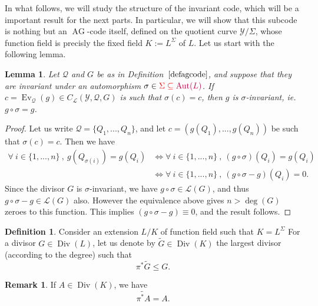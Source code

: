 \documentclass[10pt]{article}
\newtheorem{lem1}[thm]{Lemma}
\theoremstyle{definition}
\newtheorem{rq1}[thm]{Remark}
\theoremstyle{definition}
\theoremstyle{definition}
\newtheorem{def1}[thm]{Definition}
\newcommand{\s}{\vspace{0.3cm}}
\newcommand{\su}{\subseteq}
\newcommand{\Y}{\mathcal{Y}}
\newcommand{\QR}{\mathcal{Q}}
\newcommand{\Div}{\operatorname{Div}}
\newcommand{\Aut}{\operatorname{Aut}}
\newcommand{\ag}{\operatorname{AG}}
\newcommand{\calL}{\mathcal{L}}
\begin{document}
In what follows, we will study the structure of the invariant code, which will be a important result for the next parts. In particular, we will show that this subcode is nothing but an $\ag$-code itself, defined on the quotient curve $\Y/\Sigma$, whose function field is precisly the fixed field $K:=L^{\Sigma}$ of $L$. Let us start with the following lemma.

\s

\begin{lem1} \label{inv}
Let $\QR$ and $G$ be as in Definition~$\ref{defagcode}$, and suppose that they are invariant under an automorphism $\sigma \in \color{red} \Sigma \su \color{purple} \Aut(L)$. If $c = \operatorname{Ev}_{\QR}(g) \in C_{\calL}(\Y,\QR,G)$ is such that $\sigma(c) = c$, then $g$ is $\sigma$-invariant, ie. $g\circ \sigma = g$. 
\end{lem1}

\s

\begin{proof}
Let us write $\QR = \{Q_1,...,Q_n\}$, and let $c=(g(Q_1),...,g(Q_n))$ be such that $\sigma(c)=c$. Then we have 
\begin{align*}
\forall \ i \in \{1,...,n\} \ , \ g(Q_{\sigma(i)}) = g(Q_i) &\iff \forall \ i \in \{1,...,n\} \ , \ (g \circ \sigma)(Q_i) =g(Q_i) \\
& \iff \forall \ i \in \{1,...,n\} \ , \ (g\circ \sigma - g)(Q_i) = 0.
\end{align*}
Since the divisor $G$ is $\sigma$-invariant, we have $g \circ \sigma \in \calL(G)$, and thus $g\circ \sigma - g \in \calL(G)$ also.
However the equivalence above gives $n>\deg(G)$ zeroes to this function. This implies $(g \circ \sigma - g) \equiv 0$, and the result follows.
\end{proof}

\s

\color{purple}

\begin{def1} \label{pousseavant}
Consider an extension $L/K$ of function field such that $K=L^{\Sigma}$
For a divisor $G \in \Div(L)$, let us denote by $\tilde{G} \in \Div(K)$ the largest divisor (according to the degree) such that
\[\pi^*\tilde{G} \leq G.\]
\end{def1} 

\s 

\begin{rq1} \label{jsp}
If $A \in \Div(K)$, we have 
\[\widetilde{\pi^*A}=A.\]
\end{rq1}
\end{document}
